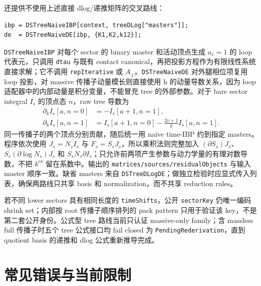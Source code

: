 ﻿\documentclass[a4paper,11pt]{article}
\begin{document}
还提供不使用上述直接 dlog/递推矩阵的交叉路线：
\begin{verbatim}
ibp = DSTreeNaiveIBP[context, treeDLog["masters"]];
de  = DSTreeNaiveDE[ibp, {K1,K2,k12}];
\end{verbatim}
\texttt{DSTreeNaiveIBP} 对每个 sector 的 binary master 和活动顶点生成 $a_v=1$ 的 loop 代表元，只调用 \texttt{dtau} 与既有 contact canonical，再把投影方程作为有限线性系统直接求解；它不调用 \texttt{repIterative} 或 $A_\pm$。\texttt{DSTreeNaiveDE} 对外腿相位项复用 loop 投影，对 massive 传播子动量模长则直接使用 h 的动量导数关系，因为 loop 适配器中的内部动量是积分变量，不能冒充 tree 的外部参数。对于 bare sector integral $I_s$ 的顶点态 $n$，raw tree 导数为
\begin{align}
 \partial_k I_s[a,n=0]&=-I_s[a+1,n=1],\\
 \partial_k I_s[a,n=1]&=I_s[a+1,n=0]-\frac{2\nu+1}{k}I_s[a,n=1].
\end{align}
同一传播子的两个顶点分别贡献，随后统一用 naive time-IBP 约到指定 masters。程序依次使用 $J_s=N_sI_s$ 与 $F_s=S_sJ_s$，所以乘积法则完整加入 $(\partial S_s)J_s$、$S_s(\partial\log N_s)J_s$ 和 $S_sN_s\partial I_s$；只允许前两项产生参数与动力学量的有理对数导数，不把 $k^{c\nu}$ 留在系数中。输出的 \texttt{matrices/sources/residualObjects} 与输入 master 顺序一致。缺省 masters 来自 \texttt{DSTreeDLogDE}；做独立检验时应显式传入列表，确保两路线只共享 basis 和 normalization，而不共享 reduction rules。

若不同 lower sectors 具有相同长度的 \texttt{timeShifts}，公开 \texttt{sectorKey} 仍唯一编码 shrink set；内部按 root 传播子顺序排列的 pack pattern 只用于验证该 key，不是第二套公开身份。公式型 tree 路线当前只认证 massive-only family；含 massless full 传播子时五个 tree 公式接口均 fail closed 为 \texttt{PendingRederivation}，直到 quotient basis 的递推和 dlog 公式重新推导完成。

\section{常见错误与当前限制}
\end{document}
